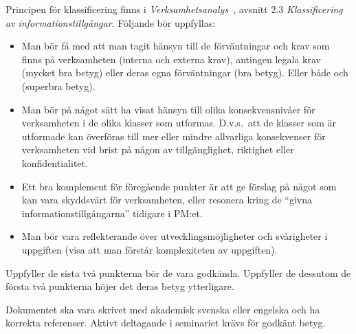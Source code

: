 \documentclass[a4paper]{llncs}
\begin{document}
\begin{enumerate}
\begin{solution}
      Principen för klassificering finns 
      i \emph{Verksamhetsanalys}~\cite{MSB2011v}, avsnitt 2.3 
      \emph{Klassificering av informationstillgångar}.
      Följande bör uppfyllas:
      \begin{itemize}
        \item Man bör få med att man tagit hänsyn till de förväntningar och krav 
          som finns på verksamheten (interna och externa krav), antingen legala 
          krav (mycket bra betyg) eller deras egna förväntningar (bra betyg).
          Eller både och (superbra betyg).
        \item Man bör på något sätt ha visat hänsyn till olika konsekvensnivåer 
          för verksamheten i de olika klasser som utformas.
          D.v.s.\ att de klasser som är utformade kan överföras till mer eller 
          mindre allvarliga konsekvenser för verksamheten vid brist på någon av 
          tillgänglighet, riktighet eller konfidentialitet.
        \item Ett bra komplement för föregående punkter är att ge förslag på 
          något som kan vara skyddsvärt för verksamheten, eller resonera kring de 
          \enquote{givna informationstillgångarna} tidigare i PM:et.
        \item Man bör vara reflekterande över utvecklingsmöjligheter och 
          svårigheter i uppgiften (visa att man förstår komplexiteten av 
          uppgiften).
      \end{itemize}
      Uppfyller de sista två punkterna bör de vara godkända.
      Uppfyller de dessutom de första två punkterna höjer det deras betyg 
      ytterligare.
    \end{solution}
\end{enumerate}

Dokumentet ska vara skrivet med akademisk svenska eller engelska och ha 
korrekta referenser.
Aktivt deltagande i seminariet krävs för godkänt betyg.


\printbibliography{}
\end{document}
